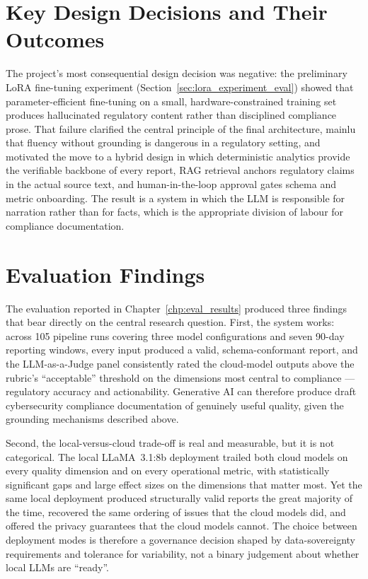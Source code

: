 \documentclass[]{UCD_CS_FYP_Report}
\begin{document}
\section{Key Design Decisions and Their Outcomes}
\label{sec:conclusion_design_decisions}

The project's most consequential design decision was negative: the preliminary LoRA fine-tuning experiment (Section~\ref{sec:lora_experiment_eval}) showed that parameter-efficient fine-tuning on a small, hardware-constrained training set produces hallucinated regulatory content rather than disciplined compliance prose. That failure clarified the central principle of the final architecture, mainlu that fluency without grounding is dangerous in a regulatory setting, and motivated the move to a hybrid design in which deterministic analytics provide the verifiable backbone of every report, RAG retrieval anchors regulatory claims in the actual source text, and human-in-the-loop approval gates schema and metric onboarding. The result is a system in which the LLM is responsible for narration rather than for facts, which is the appropriate division of labour for compliance documentation.

\section{Evaluation Findings}
\label{sec:conclusion_findings}

The evaluation reported in Chapter~\ref{chp:eval_results} produced three findings that bear directly on the central research question. First, the system works: across 105 pipeline runs covering three model configurations and seven 90-day reporting windows, every input produced a valid, schema-conformant report, and the LLM-as-a-Judge panel consistently rated the cloud-model outputs above the rubric's ``acceptable'' threshold on the dimensions most central to compliance --- regulatory accuracy and actionability. Generative AI can therefore produce draft cybersecurity compliance documentation of genuinely useful quality, given the grounding mechanisms described above.

Second, the local-versus-cloud trade-off is real and measurable, but it is not categorical. The local LLaMA~3.1:8b deployment trailed both cloud models on every quality dimension and on every operational metric, with statistically significant gaps and large effect sizes on the dimensions that matter most. Yet the same local deployment produced structurally valid reports the great majority of the time, recovered the same ordering of issues that the cloud models did, and offered the privacy guarantees that the cloud models cannot. The choice between deployment modes is therefore a governance decision shaped by data-sovereignty requirements and tolerance for variability, not a binary judgement about whether local LLMs are ``ready''.
\end{document}
